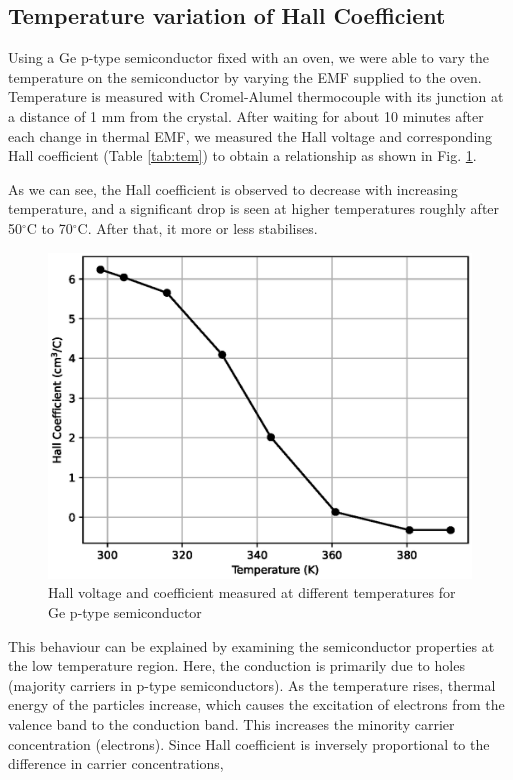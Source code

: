 \subsection{Temperature variation of Hall Coefficient}
Using a Ge p-type semiconductor fixed with an oven, we were able to vary the temperature on the semiconductor by varying the EMF supplied to the oven. Temperature is measured with Cromel-Alumel thermocouple with its junction at a distance
of 1 mm from the crystal. After waiting for about 10 minutes after each change in thermal EMF, we measured the Hall voltage and corresponding Hall coefficient (Table \ref{tab:tem}) to obtain a relationship as shown in Fig. \ref{fig:tem}.


As we can see, the Hall coefficient is
observed to decrease with increasing temperature,
and a significant drop is seen at higher temperatures roughly after 50$^\circ$C to 70$^\circ$C. After that, it more or less stabilises.
\begin{figure}
    \centering
    \includegraphics[width=1\columnwidth]{images/temp.eps}
    \caption{Hall voltage and coefficient measured at different temperatures for Ge p-type semiconductor}
    \label{fig:tem}
\end{figure}


This behaviour can be explained by examining the semiconductor properties at the low temperature region. Here, the conduction is primarily due to
holes (majority carriers in p-type semiconductors).
As the temperature rises, thermal energy of the particles increase,
which causes the excitation of electrons from the valence band to the conduction band. This increases the minority carrier concentration (electrons). Since Hall coefficient is inversely proportional to the difference in carrier concentrations,

